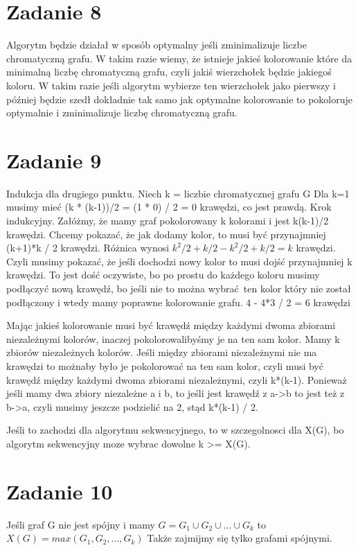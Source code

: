 \documentclass[12pt]{article}
\begin{document}
\section{Zadanie 8} %
Algorytm będzie działał w sposób optymalny jeśli zminimalizuje liczbe chromatyczną grafu. 
W takim razie wiemy, że istnieje jakieś kolorowanie które da minimalną liczbę chromatyczną grafu, czyli jakiś wierzchołek będzie jakiegoś koloru. W takim razie jeśli algorytm wybierze ten wierzchołek jako pierwszy i później będzie szedł dokładnie tak samo jak optymalne kolorowanie to pokoloruje optymalnie i zminimalizuje liczbę chromatyczną grafu.
\section{Zadanie 9} %
Indukcja dla drugiego punktu. Niech k = liczbie chromatycznej grafu G 
Dla k=1 musimy mieć (k * (k-1))/2 = (1 * 0) / 2 = 0 krawędzi, co jest prawdą.
Krok indukcyjny. Załóżmy, że mamy graf pokolorowany k kolorami i jest k(k-1)/2 krawędzi. 
Chcemy pokazać, że jak dodamy kolor, to musi być przynajmniej (k+1)*k / 2 krawędzi. 
Różnica wynosi $k^2/2+k/2 - k^2/2 + k/2 = k$ krawędzi. 
Czyli musimy pokazać, że jeśli dochodzi nowy kolor to musi dojść przynajmniej k krawędzi. To jest dość oczywiste, bo po prostu do każdego koloru musimy podłączyć nową krawędź, bo jeśli nie to można wybrać ten kolor który nie został podłączony i wtedy mamy poprawne kolorowanie grafu. 
4 - 4*3 / 2 = 6 krawędzi 


Mając jakieś kolorowanie musi być krawędź między każdymi dwoma zbiorami niezależnymi kolorów, inaczej pokolorowalibyśmy je na ten sam kolor.  
Mamy k zbiorów niezależnych kolorów. Jeśli między zbiorami niezależnymi nie ma krawędzi to możnaby było je pokolorować na ten sam kolor, czyli musi być krawędź między każdymi dwoma zbiorami niezależnymi, czyli k*(k-1). Ponieważ jeśli mamy dwa zbiory niezależne a i b, to jeśli jest krawędź z a->b to jest też z b->a, czyli musimy jeszcze podzielić na 2, stąd k*(k-1) / 2.

Jeśli to zachodzi dla algorytmu sekwencyjnego, to w szczegolnosci dla X(G), bo algorytm sekwencyjny moze wybrac dowolne k >= X(G).

\section{Zadanie 10} %
Jeśli graf G nie jest spójny i mamy $G = G_1 \cup G_2 \cup ... \cup G_k$ to $X(G) = max(G_1, G_2, ..., G_k)$
Także zajmijmy się tylko grafami spójnymi. 
\end{document}
